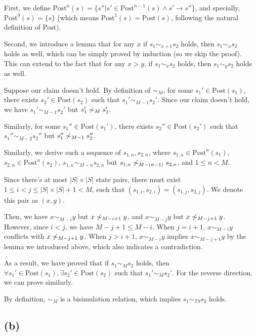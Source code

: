 First, we define $\text{Post}^{n}(s)=\{s'' | s' \in \text{Post}^{n-1}(s) \wedge s' \to s'' \}$, and
specially, $\text{Post}^{0}(s)=\{s\}$ (which means $\text{Post}^{1}(s)=\text{Post}(s)$, following the
natural definition of $\text{Post}$).

Second, we introduce a lemma that for any $x$ if $s_1 \sim_{x + 1} s_2$ holds, then
$s_1 \sim_{x} s_2$ holds as well, which can be simply proved by induction (so we skip the proof).
This can extend to the fact that for any $x > y$, if $s_1 \sim_{x} s_2$ holds, then $s_1 \sim_{y} s_2$ holds as well.

Suppose our claim doesn't hold. By definition of $\sim_{M}$, for some $s_1' \in \text{Post}(s_1)$, there
exists $s_2' \in \text{Post}(s_2)$ such that $s_1' \sim_{M -1} s_2'$.
Since our claim doesn't hold, we have $s_1' \sim_{M-1} s_2'$ but $s_1' \not \sim_{M} s_2'$.

Similarly, for some $s_1'' \in \text{Post}(s_1')$, there exists $s_2'' \in \text{Post}(s_2')$ such that
$s_1'' \sim_{M-2} s_2''$ but $s_1'' \not \sim_{M-1} s_2''$.

Similarly, we derive such a sequence of $s_{1,n}, s_{2,n}$,
where $s_{1,n} \in \text{Post}^{n}(s_1)$, $s_{2,n} \in \text{Post}^{n}(s_2)$,
$s_{1,n} \sim_{M-n} s_{2,n}$ but $s_{1,n} \not \sim_{M-(n-1)} s_{2,n}$, and $1 \leq n < M$.

Since there's at most $|S| \times |S|$ state pairs, there must exist $1 \leq i < j \leq |S| \times |S| + 1 < M$,
such that $(s_{1,i}, s_{2,i}) = (s_{1,j}, s_{2,j})$. We denote this pair as $(x, y)$.

Then, we have $x \sim_{M - i} y$ but $x \not \sim_{M - i + 1} y$, and $x \sim_{M - j} y$ but $x \not \sim_{M - j + 1} y$.
However, since $i < j$, we have $M - j + 1 \le M - i$. When $j = i + 1$, $x \sim_{M - i} y$ conflicts with
$x \not \sim_{M - j + 1} y$. When $j > i + 1$, $x \sim_{M - i} y$ implies $x \sim_{M - j + 1} y$ by the lemma we introduced above,
which also indicates a contradiction.

As a result, we have proved that if $s_1 \sim_{M} s_2$ holds, then
$\forall s_1' \in \text{Post}(s_1), \exists s_2' \in \text{Post}(s_2)$ such that $s_1' \sim_{M} s_2'$.
For the reverse direction, we can prove similarly.

By definition, $\sim_{M}$ is a bisimulation relation, which implies $s_1 \sim_{TS} s_2$ holds.

\subsection*{(b)}

